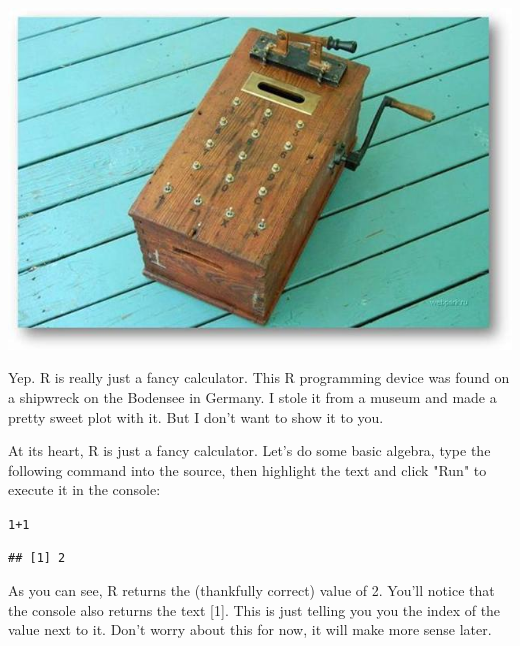 \documentclass{tufte-book}\usepackage[]{graphicx}\usepackage[]{color}
\makeatletter
\newcommand{\hlnum}[1]{\textcolor[rgb]{0.686,0.059,0.569}{#1}}%
\newcommand{\hlopt}[1]{\textcolor[rgb]{0,0,0}{#1}}%
\newenvironment{kframe}{%
 \def\at@end@of@kframe{}%
 \ifinner\ifhmode%
  \def\at@end@of@kframe{\end{minipage}}%
  \begin{minipage}{\columnwidth}%
 \fi\fi%
 \def\FrameCommand##1{\hskip\@totalleftmargin \hskip-\fboxsep
 \colorbox{shadecolor}{##1}\hskip-\fboxsep
     \hskip-\linewidth \hskip-\@totalleftmargin \hskip\columnwidth}%
 \MakeFramed {\advance\hsize-\width
   \@totalleftmargin\z@ \linewidth\hsize
   \@setminipage}}%
 {\par\unskip\endMakeFramed%
 \at@end@of@kframe}
\newenvironment{knitrout}{}{} %
\makeatother
\begin{document}
\begin{marginfigure}
\includegraphics[width=\linewidth]{woodcalc.jpg}
\caption{Yep. R is really just a fancy calculator. This R programming device was found on a shipwreck on the Bodensee in Germany. I stole it from a museum and made a pretty sweet plot with it. But I don't want to show it to you.}
\end{marginfigure}

At its heart, R is just a fancy calculator. Let's do some basic algebra, type the following command into the source, then highlight the text and click "Run" to execute it in the console:



\begin{knitrout}
\color{fgcolor}\begin{kframe}
\begin{alltt}
\hlnum{1}\hlopt{+}\hlnum{1}
\end{alltt}
\begin{verbatim}
## [1] 2
\end{verbatim}
\end{kframe}
\end{knitrout}



As you can see, R returns the (thankfully correct) value of 2. You'll notice that the console also returns the text [1]. This is just telling you you the index of the value next to it. Don't worry about this for now, it will make more sense later.
\end{document}
